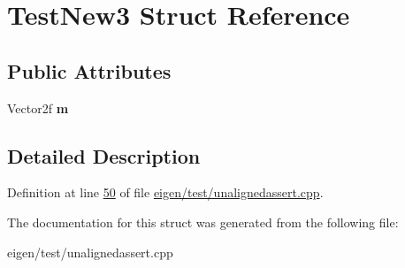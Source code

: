 \hypertarget{struct_test_new3}{}\section{Test\+New3 Struct Reference}
\label{struct_test_new3}
\subsection*{Public Attributes}
\begin{DoxyCompactItemize}
\item 
\mbox{\label{struct_test_new3_a6fbf15c52cf79ce91fefc2b410ee4799}} 
Vector2f {\bfseries m}
\end{DoxyCompactItemize}


\subsection{Detailed Description}


Definition at line \hyperlink{eigen_2test_2unalignedassert_8cpp_source_l00050}{50} of file \hyperlink{eigen_2test_2unalignedassert_8cpp_source}{eigen/test/unalignedassert.\+cpp}.



The documentation for this struct was generated from the following file\+:\begin{DoxyCompactItemize}
\item 
eigen/test/unalignedassert.\+cpp\end{DoxyCompactItemize}
